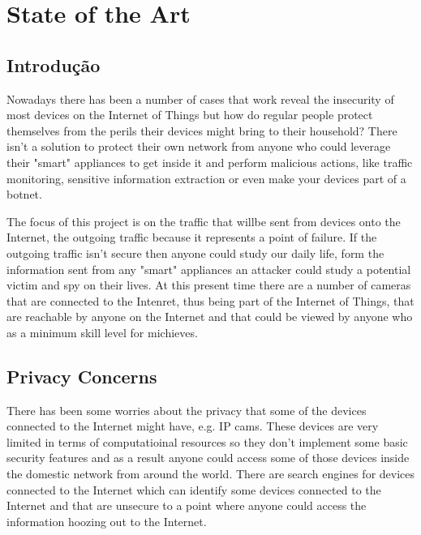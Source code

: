 \chapter{State of the Art}
\label{chap:estado-da-arte}

\section{Introdução}
\label{chap2:sec:intro}
Nowadays there has been a number of cases that work reveal the insecurity of
most devices on the Internet of Things
but how do regular people protect themselves from the perils their devices
might bring to their household? There isn't a solution to protect their own
network from anyone who could leverage their "smart" appliances to get inside
it and perform malicious actions, like traffic monitoring, sensitive
information extraction or even make your devices part of a botnet.

The focus of this project is on the traffic that willbe sent from devices onto
the Internet, the outgoing traffic because it represents a point of failure.
If the outgoing traffic isn't secure then anyone could study our daily life,
form the information sent from any "smart" appliances an attacker could study
a potential victim and spy on their lives. At this present time there are a
number of cameras that are connected to the Intenret, thus being part of the
Internet of Things, that are reachable by anyone on the Internet and that
could be viewed by anyone who as a minimum skill level for michieves.

\section{Privacy Concerns}
\label{chap2:sec:priv}
There has been some worries about the privacy that some of the devices
connected to the Internet might have, e.g. IP cams. These devices are very
limited in terms of computatioinal resources so they don't implement some basic
security features and as a result anyone could access some of those devices
inside the domestic network from around the world.
There are search engines for devices connected to the Internet which can
identify some devices connected to the Internet and that are unsecure to a
point where anyone could access the information hoozing out to the Internet.

